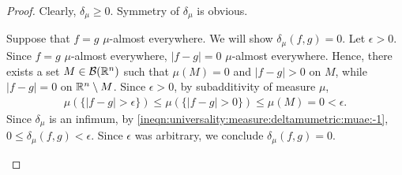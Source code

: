 \begin{proof}
Clearly, $\delta_\mu \geq 0$. Symmetry of $\delta_\mu$ is obvious.
\setcounter{step}{0}
\begin{step}[$\delta_\mu(f, g) = 0 \iff f = g$ $\mu$-almost everywhere]
Suppose that $f = g$ $\mu$-almost everywhere. We will show  $\delta_\mu(f, g) = 0$. Let $\epsilon > 0$. Since $f = g$ $\mu$-almost everywhere, $| f - g | = 0$ $\mu$-almost everywhere. Hence, there exists a set $M \in {\mathcal B}({\mathbb R}^n)$ such that $\mu(M) = 0$ and $| f - g | > 0$ on $M$, while $| f - g | = 0$ on ${\mathbb R}^n \setminus M$. Since $\epsilon > 0$, by subadditivity of measure $\mu$,
\begin{align}
    \label{ineqn:universality:measure:deltamumetric:muae:-1}
    \mu (\{ | f - g | > \epsilon \}) \leq \mu (\{ | f - g | > 0 \}) \leq \mu (M) = 0 < \epsilon.
\end{align}
Since $\delta_\mu$ is an infimum, by \ref{ineqn:universality:measure:deltamumetric:muae:-1}, $0 \leq \delta_\mu(f,g) < \epsilon$. Since $\epsilon$ was arbitrary, we conclude $\delta_\mu(f,g) = 0$.


\end{step}
\end{proof}
